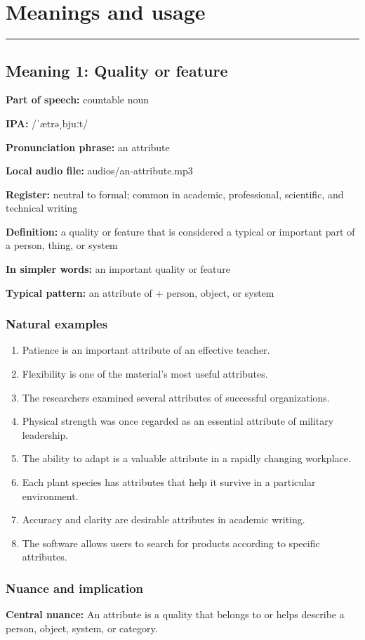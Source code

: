 \documentclass[11pt]{article}
\newcommand{\sectionrule}{\par\vspace{-0.5em}\noindent\textcolor{Accent}{\rule{\linewidth}{0.6pt}}\par}
\begin{document}
\section{Meanings and usage}
\sectionrule
\subsection{Meaning 1: Quality or feature}
\textbf{Part of speech:} countable noun

\textbf{IPA:} /ˈætrəˌbjuːt/

\textbf{Pronunciation phrase:} an attribute

\textbf{Local audio file:} audios/an-attribute.mp3

\textbf{Register:} neutral to formal; common in academic, professional, scientific, and technical writing

\textbf{Definition:} a quality or feature that is considered a typical or important part of a person, thing, or system

\textbf{In simpler words:} an important quality or feature

\textbf{Typical pattern:} an attribute of + person, object, or system

\subsubsection{Natural examples}
\begin{enumerate}
  \item Patience is an important attribute of an effective teacher.
  \item Flexibility is one of the material's most useful attributes.
  \item The researchers examined several attributes of successful organizations.
  \item Physical strength was once regarded as an essential attribute of military leadership.
  \item The ability to adapt is a valuable attribute in a rapidly changing workplace.
  \item Each plant species has attributes that help it survive in a particular environment.
  \item Accuracy and clarity are desirable attributes in academic writing.
  \item The software allows users to search for products according to specific attributes.
\end{enumerate}

\subsubsection{Nuance and implication}
\textbf{Central nuance:} An attribute is a quality that belongs to or helps describe a person, object, system, or category.
\end{document}
